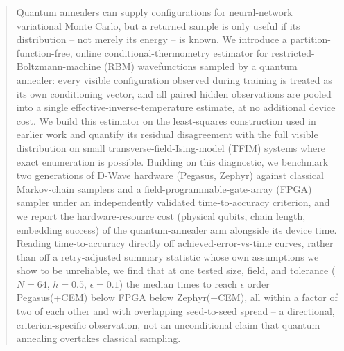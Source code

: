 \documentclass[aps,prapplied,reprint,superscriptaddress,longbibliography]{revtex4-2}
\begin{document}
\begin{abstract}
Quantum annealers can supply configurations for neural-network variational Monte Carlo, but a returned sample is only useful if its distribution -- not merely its energy -- is known. We introduce a partition-function-free, online conditional-thermometry estimator for restricted-Boltzmann-machine (RBM) wavefunctions sampled by a quantum annealer: every visible configuration observed during training is treated as its own conditioning vector, and all paired hidden observations are pooled into a single effective-inverse-temperature estimate, at no additional device cost. We build this estimator on the least-squares construction used in earlier work and quantify its residual disagreement with the full visible distribution on small transverse-field-Ising-model (TFIM) systems where exact enumeration is possible. Building on this diagnostic, we benchmark two generations of D-Wave hardware (Pegasus, Zephyr) against classical Markov-chain samplers and a field-programmable-gate-array (FPGA) sampler under an independently validated time-to-accuracy criterion, and we report the hardware-resource cost (physical qubits, chain length, embedding success) of the quantum-annealer arm alongside its device time. Reading time-to-accuracy directly off achieved-error-vs-time curves, rather than off a retry-adjusted summary statistic whose own assumptions we show to be unreliable, we find that at one tested size, field, and tolerance ($N=64$, $h=0.5$, $\epsilon=0.1$) the median times to reach $\epsilon$ order Pegasus(+CEM) below FPGA below Zephyr(+CEM), all within a factor of two of each other and with overlapping seed-to-seed spread -- a directional, criterion-specific observation, not an unconditional claim that quantum annealing overtakes classical sampling.
\end{abstract}

\maketitle











\clearpage

\end{document}
